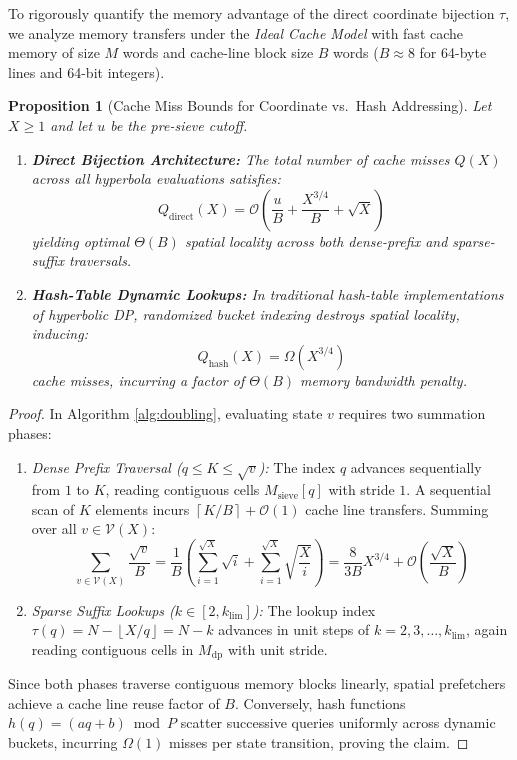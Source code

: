 \documentclass[11pt,a4paper]{article}
\theoremstyle{plain}
\newtheorem{proposition}[theorem]{Proposition}
\theoremstyle{definition}
\newcommand{\V}{\mathcal{V}}
\newcommand{\Oh}{\mathcal{O}}
\newcommand{\floor}[1]{\left\lfloor #1 \right\rfloor}
\newcommand{\ceil}[1]{\left\lceil #1 \right\rceil}
\begin{document}
To rigorously quantify the memory advantage of the direct coordinate bijection $\tau$, we analyze memory transfers under the \emph{Ideal Cache Model} \cite{frigo1999cache} with fast cache memory of size $M$ words and cache-line block size $B$ words ($B \approx 8$ for 64-byte lines and 64-bit integers).

\begin{proposition}[Cache Miss Bounds for Coordinate vs.\ Hash Addressing]
Let $X \ge 1$ and let $u$ be the pre-sieve cutoff.
\begin{enumerate}
    \item \textbf{Direct Bijection Architecture:} The total number of cache misses $Q(X)$ across all hyperbola evaluations satisfies:
    \begin{equation}
        Q_{\text{direct}}(X) = \Oh\left( \frac{u}{B} + \frac{X^{3/4}}{B} + \sqrt{X} \right)
    \end{equation}
    yielding optimal $\Theta(B)$ spatial locality across both dense-prefix and sparse-suffix traversals.
    \item \textbf{Hash-Table Dynamic Lookups:} In traditional hash-table implementations of hyperbolic DP, randomized bucket indexing destroys spatial locality, inducing:
    \begin{equation}
        Q_{\text{hash}}(X) = \Omega\left( X^{3/4} \right)
    \end{equation}
    cache misses, incurring a factor of $\Theta(B)$ memory bandwidth penalty.
\end{enumerate}
\end{proposition}

\begin{proof}
In Algorithm \ref{alg:doubling}, evaluating state $v$ requires two summation phases:
\begin{enumerate}
    \item \emph{Dense Prefix Traversal ($q \le K \le \sqrt{v}$):} The index $q$ advances sequentially from $1$ to $K$, reading contiguous cells $M_{\text{sieve}}[q]$ with stride $1$. A sequential scan of $K$ elements incurs $\ceil{K/B} + \Oh(1)$ cache line transfers. Summing over all $v \in \V(X)$:
    \begin{equation}
        \sum_{v \in \V(X)} \frac{\sqrt{v}}{B} = \frac{1}{B} \left( \sum_{i=1}^{\sqrt{X}} \sqrt{i} + \sum_{i=1}^{\sqrt{X}} \sqrt{\frac{X}{i}} \right) = \frac{8}{3B} X^{3/4} + \Oh\left(\frac{\sqrt{X}}{B}\right)
    \end{equation}
    \item \emph{Sparse Suffix Lookups ($k \in [2, k_{\text{lim}}]$):} The lookup index $\tau(q) = N - \floor{X/q} = N - k$ advances in unit steps of $k = 2, 3, \dots, k_{\text{lim}}$, again reading contiguous cells in $M_{\text{dp}}$ with unit stride.
\end{enumerate}
Since both phases traverse contiguous memory blocks linearly, spatial prefetchers achieve a cache line reuse factor of $B$. Conversely, hash functions $h(q) = (a q + b) \bmod P$ scatter successive queries uniformly across dynamic buckets, incurring $\Omega(1)$ misses per state transition, proving the claim.
\end{proof}
\end{document}
